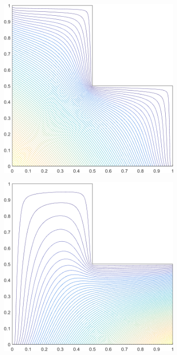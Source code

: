 \begin{figure}
\begin{subfigure}[b]{0.39\textwidth}
		\caption{}
	\end{subfigure}
	\vfill
	\begin{subfigure}[b]{0.39\textwidth}
		\centering
		\includegraphics[width=\textwidth]{figures/sec_BF/L-domain_MV1_contour_b1.png}
		\caption{}
	\end{subfigure}
	\hspace{1.5cm}
	\begin{subfigure}[b]{0.39\textwidth}
		\centering
		\includegraphics[width=\textwidth]{figures/sec_BF/L-domain_MV1_contour_b2.png}

\end{subfigure}
\end{figure}
